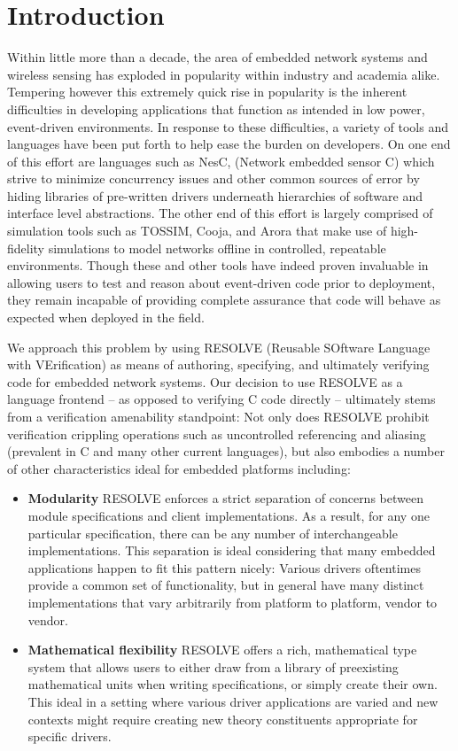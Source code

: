 \documentclass{sig-alternate}
\begin{document}
\section{Introduction}
\label{sec:intro}
Within little more than a decade, the area of embedded network systems and wireless sensing has exploded in popularity within industry and academia alike. Tempering however this extremely quick rise in popularity is the inherent difficulties in developing applications that function as intended in low power, event-driven environments. In response to these difficulties, a variety of tools and languages have been put forth  to help ease the burden on developers. On one end of this effort are languages such as NesC, (Network embedded sensor C) which strive to minimize concurrency issues and other common sources of error by hiding libraries of pre-written drivers underneath hierarchies of software and interface level abstractions. The other end of this effort is largely comprised of simulation tools such as TOSSIM, Cooja, and Arora that make use of high-fidelity simulations to model networks offline in controlled, repeatable environments. Though these and other tools have indeed proven invaluable in allowing users to test and reason about event-driven code prior to deployment, they remain incapable of providing complete assurance that code will behave as expected when deployed in the field.

We approach this problem by using RESOLVE (Reusable SOftware Language with VErification) as means of authoring, specifying, and ultimately verifying code for embedded network systems. Our decision to use RESOLVE as a language frontend -- as opposed to verifying C code directly -- ultimately stems from a verification amenability standpoint: Not only does RESOLVE prohibit verification crippling operations such as uncontrolled referencing and aliasing (prevalent in C and many other current languages)\cite{kulczycki:2004}, but also embodies a number of other characteristics ideal for embedded platforms including:

\begin{itemize}
\item \textbf{Modularity} RESOLVE enforces a strict separation of concerns between module specifications and client implementations. As a result, for any one particular specification, there can be any number of interchangeable implementations. This separation is ideal considering that many embedded applications happen to fit this pattern nicely: Various drivers oftentimes provide a common set of functionality, but in general have many distinct implementations that vary arbitrarily from platform to platform, vendor to vendor.

\item \textbf{Mathematical flexibility} RESOLVE offers a rich, mathematical type system that allows users to either draw from a library of preexisting mathematical units when writing specifications, or simply create their own. This ideal in a setting where various driver applications are varied and new contexts might require creating new theory constituents appropriate for specific drivers. %

\end{itemize}
\end{document}
